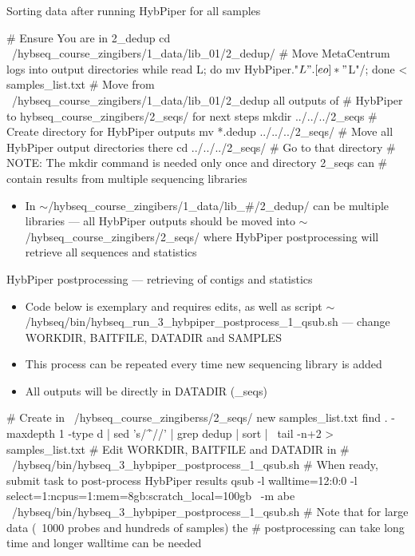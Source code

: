 \documentclass[compress,  xelatex, 11pt, xcolor=x11names, aspectratio=169,
	hyperref={
		bookmarks=true,
		unicode=true,
		colorlinks=true,
		pdftitle={HybSeq course},
		plainpages=false,
		pdfauthor={Vojtech Zeisek},
		pdfsubject={Practical processing of HybSeq target enrichment sequencing data on computing grids like MetaCentrum},
		pdfcreator={XeLaTeX},
		pdfkeywords={BASH, command line, GNU, HybSeq, Linux, MetaCentrum, sequencing shell, target enrichment},
		linkcolor=Turquoise4, %
		anchorcolor=DodgerBlue4, %
		citecolor=DodgerBlue4, %
		filecolor=DodgerBlue4, %
		menucolor=Tan4, %
		urlcolor=DarkOliveGreen4 %
		},
	url={hyphens, lowtilde} %
	]{beamer}
\renewcommand{\texttt}[1]{\colorbox{Cornsilk2}{{\ttfamily #1}}}
\renewcommand{\alert}[1]{\textcolor{OrangeRed3}{#1}}
\begin{document}
\begin{frame}[fragile]{Sorting data after running HybPiper for all samples}
	\begin{bashcode}
    # Ensure You are in 2_dedup
    cd ~/hybseq_course_zingibers/1_data/lib_01/2_dedup/
    # Move MetaCentrum logs into output directories
    while read L; do mv HybPiper."$L".[eo]* "$L"/; done < samples_list.txt
    # Move from ~/hybseq_course_zingibers/1_data/lib_01/2_dedup all outputs of
    # HybPiper to hybseq_course_zingibers/2_seqs/ for next steps
    mkdir ../../../2_seqs # Create directory for HybPiper outputs
    mv *.dedup ../../../2_seqs/ # Move all HybPiper output directories there
    cd ../../../2_seqs/ # Go to that directory
    # NOTE: The mkdir command is needed only once and directory 2_seqs can
    # contain results from multiple sequencing libraries
	\end{bashcode}
	\begin{itemize}
		\item In \texttt{$\sim$/hybseq\_course\_zingibers/1\_data/lib\_\#/2\_dedup/} can be multiple libraries --- all HybPiper outputs should be moved into \texttt{$\sim$/hybseq\_course\_zingibers/2\_seqs/} where HybPiper postprocessing will retrieve all sequences and statistics
	\end{itemize}
\end{frame}

\begin{frame}[fragile]{HybPiper postprocessing --- retrieving of contigs and statistics}
	\begin{itemize}
		\item \alert{Code below is exemplary and requires edits, as well as script \texttt{$\sim$/hybseq/bin/hybseq\_run\_3\_hybpiper\_postprocess\_1\_qsub.sh} --- change \texttt{WORKDIR}, \texttt{BAITFILE}, \texttt{DATADIR} and \texttt{SAMPLES}}
		\item This process can be repeated every time new sequencing library is added
		\item All outputs will be directly in \texttt{DATADIR} (\texttt{2\_seqs})
	\end{itemize}
	\begin{bashcode}
    # Create in ~/hybseq_course_zingiberss/2_seqs/ new samples_list.txt
    find . -maxdepth 1 -type d | sed 's/^\.\///' | grep dedup | sort | \
      tail -n+2 > samples_list.txt
    # Edit WORKDIR, BAITFILE and DATADIR in
    # ~/hybseq/bin/hybseq_3_hybpiper_postprocess_1_qsub.sh
    # When ready, submit task to post-process HybPiper results
    qsub -l walltime=12:0:0 -l select=1:ncpus=1:mem=8gb:scratch_local=100gb \
       -m abe ~/hybseq/bin/hybseq_3_hybpiper_postprocess_1_qsub.sh
    # Note that for large data (~1000 probes and hundreds of samples) the
    # postprocessing can take long time and longer walltime can be needed
	\end{bashcode}
\end{frame}
\end{document}
